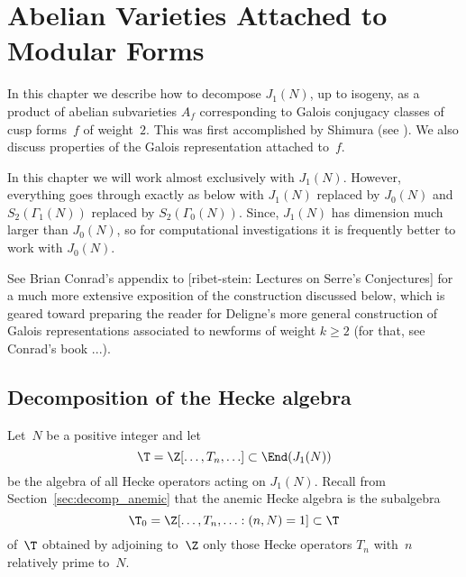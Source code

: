 \documentclass{report}
\begin{document}
\chapter{Abelian Varieties Attached to Modular Forms}

In this chapter we describe how to decompose $J_1(N)$, up to
isogeny, as a product of abelian subvarieties $A_f$ corresponding
to Galois conjugacy classes of cusp forms~$f$ of weight~$2$.  This
was first accomplished by Shimura (see \cite[Theorem
7.14]{shimura:intro}). We also discuss properties of the Galois
representation attached to~$f$. 

In this chapter we will work almost exclusively with $J_1(N)$.  However,
everything goes through exactly as below with $J_1(N)$ replaced by
$J_0(N)$ and $S_2(\Gamma_1(N))$ replaced by $S_2(\Gamma_0(N))$.
Since,  $J_1(N)$ has dimension much larger
than $J_0(N)$, so for computational investigations it
is frequently better to work with $J_0(N)$.

See Brian Conrad's appendix to [ribet-stein: Lectures on Serre's
Conjectures] for a much more extensive exposition of the
construction discussed below, which is geared toward preparing the
reader for Deligne's more general construction of Galois
representations associated to newforms of weight $k\geq 2$ (for
that, see Conrad's book ...).

\section{Decomposition of the Hecke algebra}
Let~$N$ be a positive integer and let
\[
   \T=\Z[\ldots, T_n, \ldots]\subset\End(J_1(N))
\]
be the algebra of all Hecke operators acting on $J_1(N)$. Recall
from Section~\ref{sec:decomp_anemic} that the anemic Hecke algebra
is the subalgebra
\[
  \T_0=\Z[\ldots,T_n,\ldots:(n,N)=1]\subset\T
\]
of~$\T$ obtained by adjoining to~$\Z$ only those Hecke operators
$T_n$ with~$n$ relatively prime to~$N$.
\end{document}
